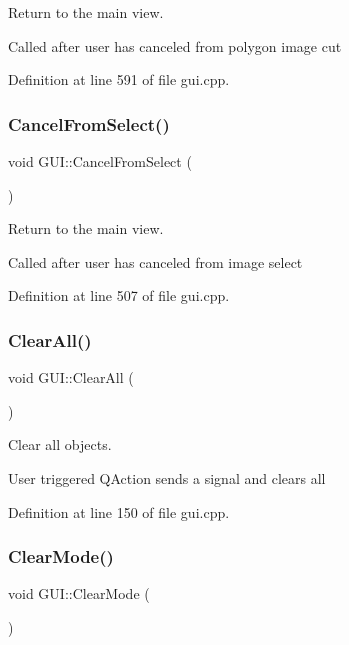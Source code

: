 Return to the main view. 

Called after user has canceled from polygon image cut 

Definition at line 591 of file gui.\+cpp.

\mbox{\label{classGUI_a3e6d9c2c9482bf8cb9655899b36e8bc1}} 
\subsubsection{\texorpdfstring{Cancel\+From\+Select()}{CancelFromSelect()}}
{\footnotesize\ttfamily void G\+U\+I\+::\+Cancel\+From\+Select (\begin{DoxyParamCaption}{ }\end{DoxyParamCaption})}



Return to the main view. 

Called after user has canceled from image select 

Definition at line 507 of file gui.\+cpp.

\mbox{\label{classGUI_a19c82a62a2b41460c81317fa967e3a1e}} 
\subsubsection{\texorpdfstring{Clear\+All()}{ClearAll()}}
{\footnotesize\ttfamily void G\+U\+I\+::\+Clear\+All (\begin{DoxyParamCaption}{ }\end{DoxyParamCaption})}



Clear all objects. 

User triggered Q\+Action sends a signal and clears all 

Definition at line 150 of file gui.\+cpp.

\mbox{\label{classGUI_afb6e169c9372800e69c70a3889420325}} 
\subsubsection{\texorpdfstring{Clear\+Mode()}{ClearMode()}}
{\footnotesize\ttfamily void G\+U\+I\+::\+Clear\+Mode (\begin{DoxyParamCaption}{ }\end{DoxyParamCaption})}



